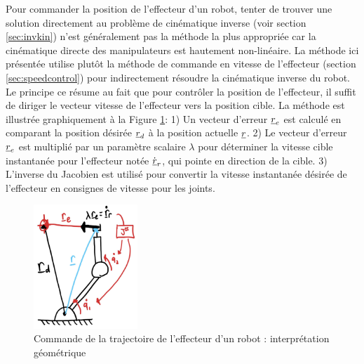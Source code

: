 Pour commander la position de l'effecteur d'un robot, tenter de trouver une solution directement au problème de cinématique inverse (voir section \ref{sec:invkin}) n'est généralement pas la méthode la plus appropriée car la cinématique directe des manipulateurs est hautement non-linéaire. La méthode ici présentée utilise plutôt la méthode de commande en vitesse de l'effecteur (section \ref{sec:speedcontrol}) pour indirectement résoudre la cinématique inverse du robot. Le principe ce résume au fait que pour contrôler la position de l'effecteur, il suffit de diriger le vecteur vitesse de l'effecteur vers la position cible. La méthode est illustrée graphiquement à la Figure \ref{fig:robotspeedcontrolgeo}: 1) Un vecteur d'erreur $\underline{r}_e$ est calculé en comparant la position désirée $\underline{r}_d$ à la position actuelle $\underline{r}$. 2) Le vecteur d'erreur $\underline{r}_e$ est multiplié par un paramètre scalaire $\lambda$ pour déterminer la vitesse cible instantanée pour l'effecteur notée $\dot{\underline{r}}_r$, qui pointe en direction de la cible. 3) L'inverse du Jacobien est utilisé pour convertir la vitesse instantanée désirée de l'effecteur en consignes de vitesse pour les joints. 
\begin{figure}[H]
	\centering
		\includegraphics[width=0.35\textwidth]{fig/robotspeedcontrolgeo.jpg}
	\caption{Commande de la trajectoire de l'effecteur d'un robot : interprétation géométrique}
	\label{fig:robotspeedcontrolgeo}
\end{figure}



